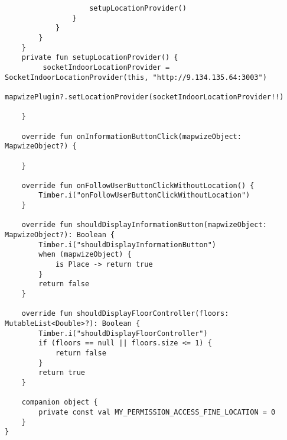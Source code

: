 \begin{lstlisting}
                    setupLocationProvider()
                }
            }
        }
    }
    private fun setupLocationProvider() {
         socketIndoorLocationProvider = SocketIndoorLocationProvider(this, "http://9.134.135.64:3003")
        mapwizePlugin?.setLocationProvider(socketIndoorLocationProvider!!)

    }

    override fun onInformationButtonClick(mapwizeObject: MapwizeObject?) {

    }

    override fun onFollowUserButtonClickWithoutLocation() {
        Timber.i("onFollowUserButtonClickWithoutLocation")
    }

    override fun shouldDisplayInformationButton(mapwizeObject: MapwizeObject?): Boolean {
        Timber.i("shouldDisplayInformationButton")
        when (mapwizeObject) {
            is Place -> return true
        }
        return false
    }

    override fun shouldDisplayFloorController(floors: MutableList<Double>?): Boolean {
        Timber.i("shouldDisplayFloorController")
        if (floors == null || floors.size <= 1) {
            return false
        }
        return true
    }

    companion object {
        private const val MY_PERMISSION_ACCESS_FINE_LOCATION = 0
    }
}
\end{lstlisting}